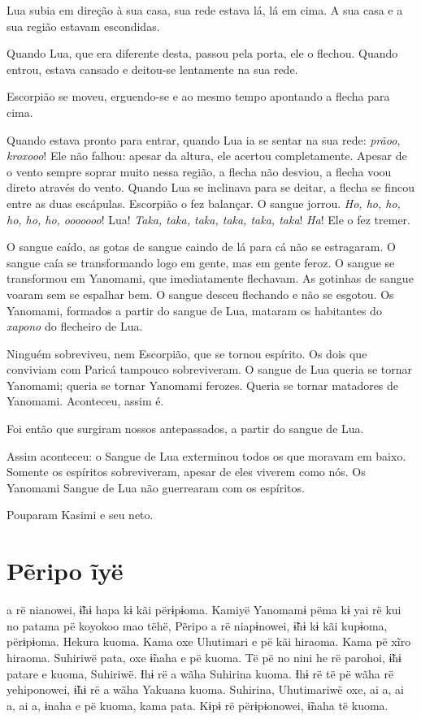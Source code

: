 Lua subia em direção à sua casa, sua rede estava lá, lá em cima. A sua
casa e a sua região estavam escondidas. 

Quando Lua, que era diferente desta, passou pela porta, ele o flechou.
Quando entrou, estava cansado e deitou-se lentamente na sua rede. 

Escorpião se moveu, erguendo-se e ao mesmo tempo apontando a flecha
para cima. 

Quando estava pronto para entrar, quando Lua ia se sentar na sua
rede: \textit{prãoo, kroxooo}! Ele não falhou: apesar da altura, ele
acertou completamente. Apesar de o vento sempre soprar muito nessa região,
a flecha não desviou, a flecha voou direto através do vento. Quando Lua se inclinava para se deitar, a flecha se fincou entre as duas
escápulas. Escorpião o fez balançar. O sangue jorrou. \textit{Ho, ho, ho,
ho, ho, ho, ooooooo}! Lua! \textit{Taka, taka, taka, taka, taka,
taka}! \textit{Ha}! Ele o fez tremer. 

O sangue caído, as gotas de sangue caindo de lá para cá não se
estragaram. O sangue caía se transformando logo em gente, mas em
gente feroz. O sangue se transformou em Yanomami, que imediatamente
flechavam. As gotinhas de sangue voaram sem se espalhar bem. O sangue
desceu flechando e não se esgotou. Os Yanomami, formados a partir
do sangue de Lua, mataram os habitantes do \textit{xapono} do flecheiro de Lua. 

Ninguém sobreviveu, nem Escorpião, que se tornou espírito. Os dois que
conviviam com Paricá tampouco sobreviveram. O sangue de Lua queria se
tornar Yanomami; queria se tornar Yanomami ferozes. Queria se tornar
matadores de Yanomami. Aconteceu, assim é. 

Foi então que surgiram nossos antepassados, a partir do sangue de Lua. 

Assim aconteceu: o Sangue de Lua exterminou todos os que moravam em
baixo. Somente os espíritos sobreviveram, apesar de eles viverem como
nós. Os Yanomami Sangue de Lua não guerrearam com os espíritos.

Pouparam Kasimi e seu neto. 

\chapter{Pẽripo ĩyë}

 a rë nianowei, ɨ̃hɨ hapa kɨ kãi përɨpɨoma. Kamiyë Yanomamɨ pëma kɨ
yai rë kui no patama pë koyokoo mao tëhë, Pẽripo a rë niapɨnowei, ɨ̃hɨ kɨ
kãi kupɨoma, përɨpɨoma. Hekura kuoma. Kama oxe Uhutimari e pë kãi
hiraoma. Kama pë xĩro hiraoma. Suhiriwë pata, oxe ɨ̃naha e pë kuoma. Të
pë no nini he rë parohoi, ɨ̃hɨ patare e kuoma, Suhiriwë. Ɨhɨ rë a wãha
Suhirina kuoma. Ɨhɨ rë të pë wãha rë yehiponowei, ɨ̃hɨ rë a wãha Yakuana
kuoma. Suhirina, Uhutimariwë oxe, ai a, ai a, ai a, ɨnaha e pë kuoma,
kama pata. Kɨpɨ rë përɨpɨonowei, ɨ̃naha të kuoma. 

